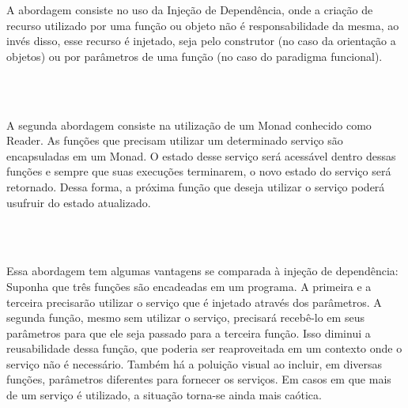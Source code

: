 A abordagem consiste no uso da Injeção de Dependência, onde a criação de 
recurso utilizado por uma função ou objeto não é responsabilidade da mesma, 
ao invés disso, esse recurso é injetado, seja pelo construtor (no caso da 
orientação a objetos) ou por parâmetros de uma função (no caso do paradigma 
funcional).

\begin{lstlisting}[caption={Injeção de Dependência funcional},label=fpdi]
    
    

\end{lstlisting}

A segunda abordagem consiste na utilização de um Monad conhecido como 
Reader. As funções que precisam utilizar um determinado serviço são 
encapsuladas em um Monad. O estado desse serviço será acessável dentro 
dessas funções e sempre que suas execuções terminarem, o novo estado 
do serviço será retornado. Dessa forma, a próxima função que deseja 
utilizar o serviço poderá usufruir do estado atualizado.

\begin{lstlisting}[caption={Monad Reader},label=fpreader]
    
    

\end{lstlisting}

Essa abordagem tem algumas vantagens se comparada à injeção de dependência: 
Suponha que três funções são encadeadas em um programa. A primeira e a terceira 
precisarão utilizar o serviço que é injetado através dos parâmetros. A segunda 
função, mesmo sem utilizar o serviço, precisará recebê-lo em seus parâmetros 
para que ele seja passado para a terceira função. Isso diminui a reusabilidade 
dessa função, que poderia ser reaproveitada em um contexto onde o serviço não 
é necessário. Também há a poluição visual ao incluir, em diversas funções, 
parâmetros diferentes para fornecer os serviços. Em casos em que mais de um serviço 
é utilizado, a situação torna-se ainda mais caótica.